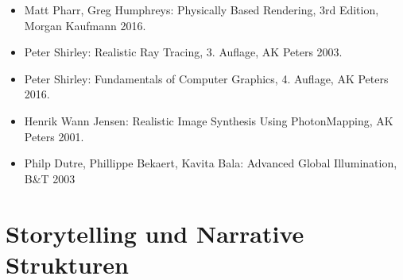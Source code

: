 \begin{itemize}
\item
  Matt Pharr, Greg Humphreys: Physically Based Rendering, 3rd Edition,
  Morgan Kaufmann 2016.
\item
  Peter Shirley: Realistic Ray Tracing, 3. Auflage, AK Peters 2003.
\item
  Peter Shirley: Fundamentals of Computer Graphics, 4. Auflage, AK
  Peters 2016.
\item
  Henrik Wann Jensen: Realistic Image Synthesis Using PhotonMapping, AK
  Peters 2001.
\item
  Philp Dutre, Phillippe Bekaert, Kavita Bala: Advanced Global
  Illumination, B\&T 2003
\end{itemize}

\chapter{Storytelling und Narrative
Strukturen}\label{storytelling-und-narrative-strukturen}

